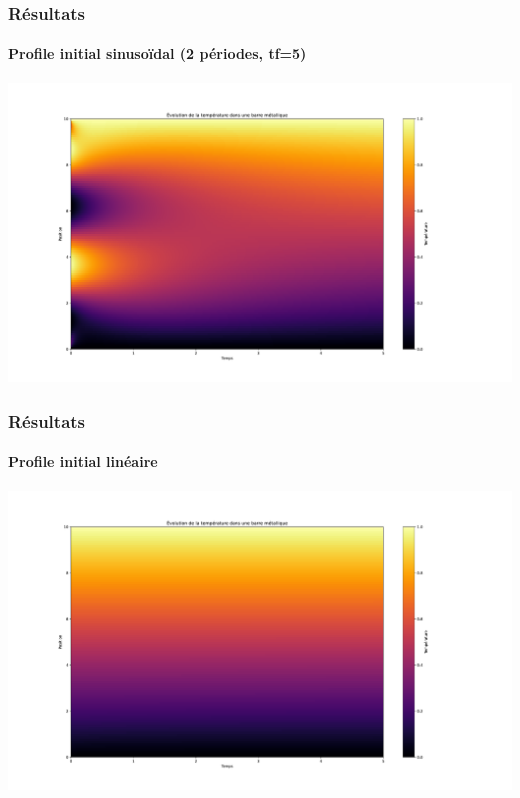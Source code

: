 \documentclass{beamer}
\begin{document}
    \begin{frame}
    \frametitle{Résultats}
    \framesubtitle{Profile initial sinusoïdal (2 périodes, tf=5)}

    \begin{center}
    \includegraphics[width=1.2\linewidth]{figs/Figure_3.pdf}
    \end{center}


    \end{frame}



    \begin{frame}
    \frametitle{Résultats}
    \framesubtitle{Profile initial linéaire}

    \begin{center}
    \includegraphics[width=1.2\linewidth]{figs/Figure_4.pdf}
    \end{center}


    \end{frame}
\end{document}
